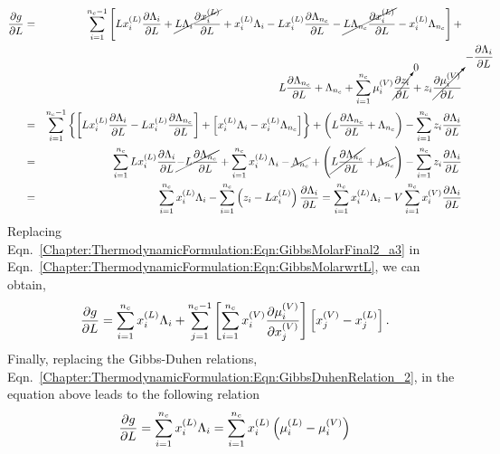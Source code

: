 \begin{eqnarray}
  \frc{\partial g}{\partial L} &=& \summation_{i=1}^{n_{c}-1}\left[L\mfr[x]{i}{L}\frc{\partial\Lambda_{i}}{\partial L} + \cancel{L\Lambda_{i}\frc{\partial\mfr[x]{i}{L}}{\partial L}} + \mfr[x]{i}{L}\Lambda_{i} - L\mfr[x]{i}{L}\frc{\partial\Lambda_{n_{c}}}{\partial L} - \cancel{L\Lambda_{n_{c}}\frc{\partial\mfr[x]{i}{L}}{\partial L}} - \mfr[x]{i}{L}\Lambda_{n_{c}} \right] +\nonumber \\
                               && \hspace{1cm} L\frc{\partial\Lambda_{n_{c}}}{\partial L} + \Lambda_{n_{c}} + \summation_{i=1}^{n_{c}} \mfr[\mu]{i}{V}\cancelto{0}{\frc{\partial z_{i}}{\partial L}} + z_{i}\cancelto{-\frc{\partial\Lambda_{i}}{\partial L}}{\frc{\partial\mfr[\mu]{i}{V}}{\partial L}} \nonumber \\
                              &=& \summation_{i=1}^{n_{c}-1}\left\{\left[L\mfr[x]{i}{L}\frc{\partial\Lambda_{i}}{\partial L} - L\mfr[x]{i}{L}\frc{\partial\Lambda_{n_{c}}}{\partial L}\right] + \left[\mfr[x]{i}{L}\Lambda_{i} - \mfr[x]{i}{L}\Lambda_{n_{c}}\right]\right\} + \left(L\frc{\partial\Lambda_{n_{c}}}{\partial L} + \Lambda_{n_{c}}\right) -\summation_{i=1}^{n_{c}} z_{i}\frc{\partial\Lambda_{i}}{\partial L} \nonumber \\
                              &=& \summation_{i=1}^{n_{c}} L\mfr[x]{i}{L}\frc{\partial\Lambda_{i}}{\partial L} \cancel{-L\frc{\partial\Lambda_{n_{c}}}{\partial L}} + \summation_{i=1}^{n_{c}} \mfr[x]{i}{L}\Lambda_{i} -\cancel{\Lambda_{n_{c}}} + \left(\cancel{L\frc{\partial\Lambda_{n_{c}}}{\partial L}} + \cancel{\Lambda_{n_{c}}}\right) -\summation_{i=1}^{n_{c}} z_{i}\frc{\partial\Lambda_{i}}{\partial L} \nonumber \\
                              &=& \summation_{i=1}^{n_{c}}\mfr[x]{i}{L}\Lambda_{i} - \summation_{i=1}^{n_{c}}\left(z_{i}-L\mfr[x]{i}{L}\right)\frc{\partial\Lambda_{i}}{\partial L} = \summation_{i=1}^{n_{c}}\mfr[x]{i}{L}\Lambda_{i} - V\summation_{i=1}^{n_{c}}\mfr[x]{i}{V}\frc{\partial\Lambda_{i}}{\partial L}\label{Chapter:ThermodynamicFormulation:Eqn:GibbsMolarwrtL}
\end{eqnarray}
Replacing Eqn.~\ref{Chapter:ThermodynamicFormulation:Eqn:GibbsMolarFinal2_a3} in Eqn.~\ref{Chapter:ThermodynamicFormulation:Eqn:GibbsMolarwrtL}, we can obtain,
\begin{displaymath}
   \frc{\partial g}{\partial L} = \summation_{i=1}^{n_{c}}\mfr[x]{i}{L}\Lambda_{i} + \summation_{j=1}^{n_{c}-1}\left[\summation_{i=1}^{n_{c}}\mfr[x]{i}{V}\frc{\partial\mfr[\mu]{i}{V}}{\partial\mfr[x]{j}{V}}\right]\left[\mfr[x]{j}{V} - \mfr[x]{j}{L}\right].
\end{displaymath}
Finally, replacing the Gibbs-Duhen relations, Eqn.~\ref{Chapter:ThermodynamicFormulation:Eqn:GibbsDuhenRelation_2}, in the equation above leads to the following relation
   \begin{equation}
       \frc{\partial g}{\partial L} = \summation_{i=1}^{n_{c}} \mfr[x]{i}{L}\Lambda_{i} = \summation_{i=1}^{n_{c}} \mfr[x]{i}{L} \left(\mfr[\mu]{i}{L}-\mfr[\mu]{i}{V}\right)\label{Chapter:ThermodynamicFormulation:Eqn:PartialGibbsMolarWRTLiquidMolar}
   \end{equation}

